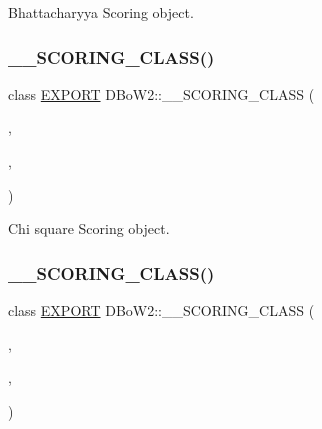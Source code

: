 Bhattacharyya Scoring object. 

\mbox{\label{namespace_d_bo_w2_adc330022cadf004b7ed5b84203287039}} 
\subsubsection{\texorpdfstring{\+\_\+\+\_\+\+S\+C\+O\+R\+I\+N\+G\+\_\+\+C\+L\+A\+S\+S()}{\_\_SCORING\_CLASS()}\hspace{0.1cm}{\footnotesize\ttfamily [5/6]}}
{\footnotesize\ttfamily class \mbox{\hyperlink{_d_bo_w2_2_d_utils_2config_8h_a3472d8cdbb788d5f1815b3522595bc49}{E\+X\+P\+O\+RT}} D\+Bo\+W2\+::\+\_\+\+\_\+\+S\+C\+O\+R\+I\+N\+G\+\_\+\+C\+L\+A\+SS (\begin{DoxyParamCaption}\item[{Chi\+Square\+Scoring}]{,  }\item[{true}]{,  }\item[{\mbox{\hyperlink{namespace_d_bo_w2_a53e9e0bcfc25c861815e413a7cf3fa51a94f5879ff083c0a8364805ae4f9c2d5c}{L1}}}]{ }\end{DoxyParamCaption})}



Chi square Scoring object. 

\mbox{\label{namespace_d_bo_w2_a9af1c21239089d77c337c65fac3e7bf5}} 
\subsubsection{\texorpdfstring{\+\_\+\+\_\+\+S\+C\+O\+R\+I\+N\+G\+\_\+\+C\+L\+A\+S\+S()}{\_\_SCORING\_CLASS()}\hspace{0.1cm}{\footnotesize\ttfamily [6/6]}}
{\footnotesize\ttfamily class \mbox{\hyperlink{_d_bo_w2_2_d_utils_2config_8h_a3472d8cdbb788d5f1815b3522595bc49}{E\+X\+P\+O\+RT}} D\+Bo\+W2\+::\+\_\+\+\_\+\+S\+C\+O\+R\+I\+N\+G\+\_\+\+C\+L\+A\+SS (\begin{DoxyParamCaption}\item[{K\+L\+Scoring}]{,  }\item[{true}]{,  }\item[{\mbox{\hyperlink{namespace_d_bo_w2_a53e9e0bcfc25c861815e413a7cf3fa51a94f5879ff083c0a8364805ae4f9c2d5c}{L1}}}]{ }\end{DoxyParamCaption})}



